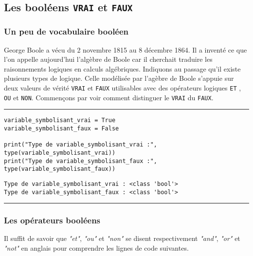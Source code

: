 \subsection{Les booléens \texttt{VRAI} et \texttt{FAUX}}

\subsubsection{Un peu de vocabulaire booléen}

George Boole a vécu du 2 novembre 1815 au 8 décembre 1864. Il a inventé ce que l'on appelle aujourd'hui l'algèbre de Boole car il cherchait traduire les raisonnements logiques en calculs algébriques. Indiquons au passage qu'il existe plusieurs types de logique. Celle modélisée par l'agèbre de Boole s'appuie sur deux valeurs de vérité \texttt{VRAI} et \texttt{FAUX} utilisables avec des opérateurs logiques \texttt{ET} , \texttt{OU} et \texttt{NON}. Commençons par voir comment distinguer le \texttt{VRAI} du \texttt{FAUX}.


\bigskip
{\hrule height .5mm}
\begin{verbatim}
variable_symbolisant_vrai = True
variable_symbolisant_faux = False

print("Type de variable_symbolisant_vrai :", type(variable_symbolisant_vrai))
print("Type de variable_symbolisant_faux :", type(variable_symbolisant_faux))
\end{verbatim}
 \color{ForestGreen}
\vspace{-1.5em}
\begin{verbatim}
Type de variable_symbolisant_vrai : <class 'bool'>
Type de variable_symbolisant_faux : <class 'bool'>
\end{verbatim} \color{Black}
{\hrule height .5mm}
\bigskip


\subsubsection{Les opérateurs booléens}

Il suffit de savoir que \textit{"et"}, \textit{"ou"} et \textit{"non"} se disent respectivement \textit{"and"}, \textit{"or"} et \textit{"not"} en anglais pour comprendre les lignes de code suivantes.


